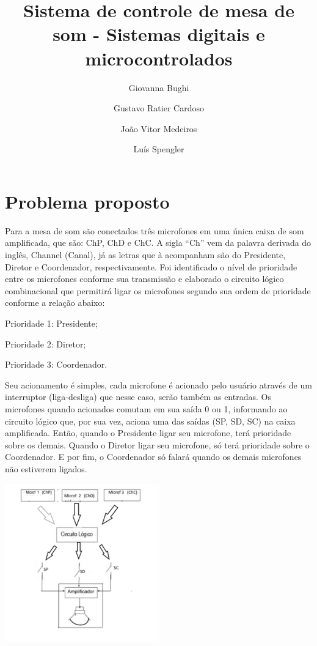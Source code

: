 \documentclass{article}
\title{Sistema de controle de mesa de som - Sistemas digitais e microcontrolados}
\date{}
\author[1]{Giovanna Bughi}
\author[2]{Gustavo Ratier Cardoso}
\author[3]{João Vitor Medeiros}
\author[4]{Luís Spengler}
\affil[1,2,3,4]{Instituto Federal de Educação, Ciência e Tecnologia de Mato Grosso do Sul}
\begin{document}
\maketitle

\tableofcontents

\medskip

\vspace{500mm}
\section{Problema proposto}
Para a mesa de som são conectados três microfones em uma única caixa de som amplificada, que são: ChP, ChD e ChC. A sigla “Ch” vem da palavra derivada do inglês, Channel (Canal), já as letras que à acompanham são do Presidente, Diretor e Coordenador, respectivamente. Foi identificado o nível de prioridade entre os microfones conforme sua transmissão e elaborado o circuito lógico combinacional que permitirá ligar os microfones segundo sua ordem de prioridade conforme a relação abaixo:

Prioridade 1: Presidente;

Prioridade 2: Diretor;

Prioridade 3: Coordenador.

Seu acionamento é simples, cada microfone é acionado pelo usuário através de um interruptor (liga-desliga) que nesse caso, serão também as entradas. Os microfones quando acionados comutam em sua saída 0 ou 1, informando ao circuito lógico que, por sua vez, aciona uma das saídas (SP, SD, SC) na caixa amplificada. Então, quando o Presidente ligar seu microfone, terá prioridade sobre os demais. Quando o Diretor ligar seu microfone, só terá prioridade sobre o Coordenador. E por fim, o Coordenador só falará quando os demais microfones não estiverem ligados.

\vspace{15mm}
\begin{center}
\includegraphics[width=0.5\textwidth]{esbocoroubado}
\end{center}
\end{document}
